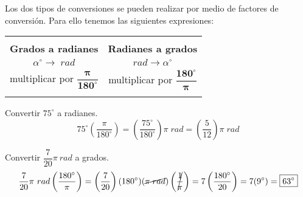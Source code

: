 Los dos tipos de conversiones se pueden realizar por medio de factores de 
conversión. Para ello tenemos las siguientes expresiones:

\begin{center}
	\renewcommand{\arraystretch}{1.2}
	\setlength{\tabcolsep}{20pt} %
	\begin{tabular}{|c c |}
		\hline
		& \\
		\textbf{Grados a radianes} & \textbf{Radianes a grados}  \\ 
		$\alpha ^\circ \rightarrow\; rad$ & $rad \rightarrow \alpha ^\circ$ \\
		multiplicar por $\pmb{\dfrac{\pi}{180^\circ}}$ & 
		multiplicar por $\pmb{\dfrac{180^\circ}{\pi}}$ \\[5mm]		
		& \\
		\hline
	\end{tabular}
\end{center}

\begin{example}
	Convertir $75^\circ$ a radianes.
	$$75^\circ\left(\dfrac{\pi}{180^\circ} \right) = 
	\left( \dfrac{75^\circ}{180^\circ} \right) \pi\; rad = 
	\boxed{\left( \dfrac{5}{12}\right)\pi\; rad } $$
\end{example}

\begin{example}
	Convertir $\dfrac{7}{20} \pi\ rad$ a grados.
	$$\dfrac{7}{20} \pi\ rad \left(\dfrac{180^\circ}{\pi} \right) = 
		\left( \dfrac{7}{20} \right)(180^\circ) (\cancel{\pi\; rad})
		\left(\cancel{\dfrac{1}{\pi}}\right) = 
		7 \left(\dfrac{180^\circ}{20}\right) = 
		7 (9^\circ) = \boxed{63^\circ}
	$$
\end{example}

